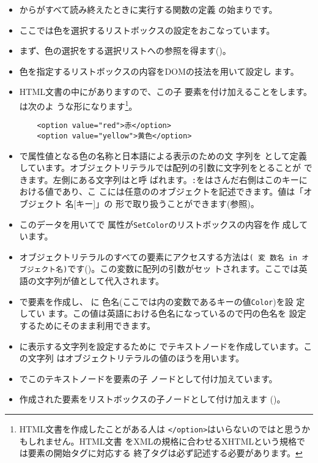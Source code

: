 \begin{itemize}
 \item {}から\HTML がすべて読み終えたときに実行する関数の定義
       の始まりです。
  \item ここでは色を選択するリストボックスの設定をおこなっています。
 \item まず、色の選択をする選択リストへの参照を得ます()。
  \item 色を指定するリストボックスの内容をDOMの技法を用いて設定し
       ます。
 \item HTML文書の中にがありますので、この子
       要素を付け加えることをします。は次のよ
       うな形になります\footnote{HTML文書を作成したことがある人は
       \texttt{</option>}はいらないのではと思うかもしれません。HTML文書
       をXMLの規格に合わせるXHTMLという規格では要素の開始タグに対応する
       終了タグは必ず記述する必要があります。}。
\begin{verbatim}
	<option value="red">赤</option>
	<option value="yellow">黄色</option>
\end{verbatim}
 \item {}で属性値となる色の名称と日本語による表示のための文
       字列を
       として定義しています。オブジェクトリテラルでは配列の引数に文字列をとることが
       できます。左側にある文字列はと呼
       ばれます。\texttt{:}をはさんだ右側はこのキーにおける値であり、こ
       こには任意の\JS のオブジェクトを記述できます。値は「オブジェクト
       名[キー]」の
       形で取り扱うことができます(参照)。
 \item このデータを用いてで
       属性が\texttt{SetColor}のリストボックスの内容を作
       成しています。
 \item オブジェクトリテラルのすべての要素にアクセスする方法は\texttt{( 変
       数名 in オブジェクト名)}です()。この変数に配列の引数がセッ
       トされます。ここでは英語の文字列が値として代入されます。
 \item {}で要素を作成し、
       に
       色名(ここでは内の変数であるキーの値\texttt{Color})を設
       定してい ます。この値は英語における色名になっているので円の色名を
       設定するためにそのまま利用できます。
 \item {}に表示する文字列を設定するために
       でテキストノードを作成しています。この文字列
       はオブジェクトリテラルの値のほうを用います。
 \item {}でこのテキストノードを要素の子
       ノードとして付け加えています。
 \item 作成された要素をリストボックスの子ノードとして付け加えます
       ()。
\end{itemize}
